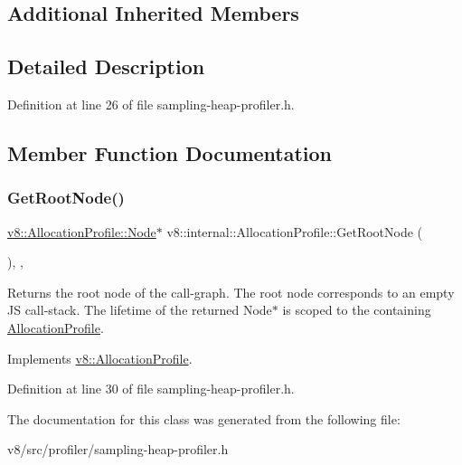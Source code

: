 \subsection*{Additional Inherited Members}


\subsection{Detailed Description}


Definition at line 26 of file sampling-\/heap-\/profiler.\+h.



\subsection{Member Function Documentation}
\mbox{\label{classv8_1_1internal_1_1AllocationProfile_abb93406eaccd8b37de3e080d0620bc2b}} 
\subsubsection{\texorpdfstring{Get\+Root\+Node()}{GetRootNode()}}
{\footnotesize\ttfamily \mbox{\hyperlink{structv8_1_1AllocationProfile_1_1Node}{v8\+::\+Allocation\+Profile\+::\+Node}}$\ast$ v8\+::internal\+::\+Allocation\+Profile\+::\+Get\+Root\+Node (\begin{DoxyParamCaption}{ }\end{DoxyParamCaption})\hspace{0.3cm}{\ttfamily [inline]}, {\ttfamily [override]}, {\ttfamily [virtual]}}

Returns the root node of the call-\/graph. The root node corresponds to an empty JS call-\/stack. The lifetime of the returned Node$\ast$ is scoped to the containing \mbox{\hyperlink{classv8_1_1internal_1_1AllocationProfile}{Allocation\+Profile}}. 

Implements \mbox{\hyperlink{classv8_1_1AllocationProfile_afea045dae30df5477088e2f0b7edb6c4}{v8\+::\+Allocation\+Profile}}.



Definition at line 30 of file sampling-\/heap-\/profiler.\+h.



The documentation for this class was generated from the following file\+:\begin{DoxyCompactItemize}
\item 
v8/src/profiler/sampling-\/heap-\/profiler.\+h\end{DoxyCompactItemize}

